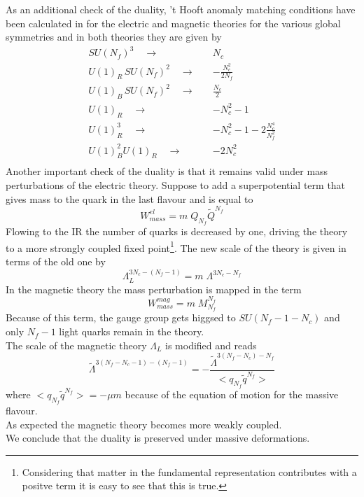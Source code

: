 As an additional check of the duality, 't Hooft anomaly matching conditions have been calculated  in \cite{Seiberg:1994pq} for the electric and magnetic theories for the various global symmetries and in both theories they are given by
\begin{equation}
\begin{aligned}
SU(N_f)^3 \quad \longrightarrow \quad   & N_c \\
U(1)_R\, SU(N_f)^2 \quad \longrightarrow \quad  & -\frac{N_c^2}{2 N_f} \\
U(1)_B\, SU(N_f)^2 \quad \longrightarrow \quad  & \frac{N_c}{2} \\
U(1)_R \quad \longrightarrow \quad  & -N_c^2 - 1 \\
U(1)_R^3 \quad \longrightarrow \quad  & -N_c^2 - 1 - 2 \frac{N_c^4}{N_f^2} \\
U(1)_B^2 U(1)_R \quad \longrightarrow \quad  & - 2 N_c^2 \\
\end{aligned}
\end{equation}
Another important check of the duality is that it remains valid under mass perturbations of the electric theory.
Suppose to add a superpotential term that gives mass to the quark in the last flavour and is equal to
\begin{equation}
	W_{mass}^{el} = m \; Q_{N_f} \tilde{Q}^{N_f}
\end{equation}
Flowing to the IR the number of quarks is decreased by one, driving the theory to a more strongly coupled fixed point\footnote{Considering that matter in the fundamental representation contributes with a positve term it is easy to see that this is true.}.
The new scale of the theory is given in terms of the old one by
\begin{equation}
 \Lambda_{L}^{3 N_c - (N_f - 1)} = m \; \Lambda^{3 N_c - N_f}
\end{equation}
In the magnetic theory the mass perturbation is mapped in the term
\begin{equation}
W_{mass}^{mag} = m \; M_{N_f}^{N_f}
\end{equation}
Because of this term, the gauge group gets higgsed to $SU(N_f-1 - N_c)$ and only $N_f -1$ light quarks remain in the theory. \\
The scale of the magnetic theory $\Lambda_L$ is modified and reads
\begin{equation}
\tilde{\Lambda}^{3(N_f - N_c -1) - (N_f -1)} = 
- \frac{
	\tilde{\Lambda}^{3 (N_f - N_c) - N_f}	
	}
	{
	< q_{N_f} \tilde{q}^{N_f}		>
	}
\end{equation}
where $< q_{N_f} \tilde{q}^{N_f}> = - \mu m $ because of the equation of motion for the massive flavour. \\
As expected the magnetic theory becomes more weakly coupled.\\
We conclude that the duality is preserved under massive deformations.  